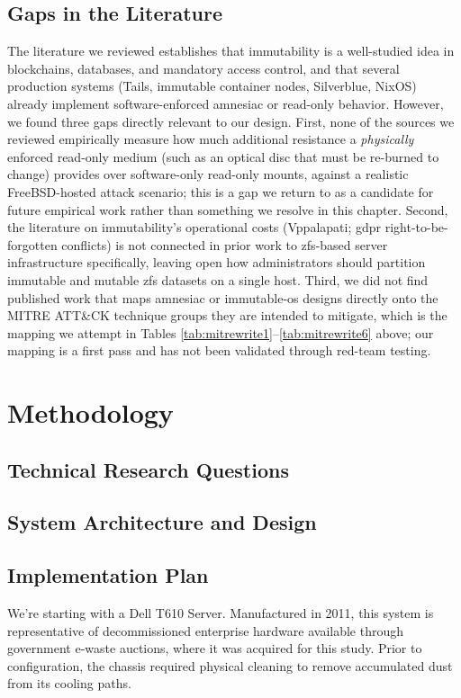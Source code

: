 \subsection{Gaps in the Literature}
The literature we reviewed establishes that immutability is a well-studied idea in blockchains, databases, and mandatory access control, and that several production systems (Tails, immutable container nodes, Silverblue, NixOS) already implement software-enforced amnesiac or read-only behavior.  However, we found three gaps directly relevant to our design.  First, none of the sources we reviewed empirically measure how much additional resistance a \emph{physically} enforced read-only medium (such as an optical disc that must be re-burned to change) provides over software-only read-only mounts, against a realistic FreeBSD-hosted \gls{attack} scenario; this is a gap we return to as a candidate for future empirical work rather than something we resolve in this chapter.  Second, the literature on immutability's operational costs (Vppalapati; \gls{gdpr} right-to-be-forgotten conflicts) is not connected in prior work to \gls{zfs}-based server infrastructure specifically, leaving open how administrators should partition immutable and mutable \gls{zfs} datasets on a single host.  Third, we did not find published work that maps \gls{amnesiac} or immutable-\gls{os} designs directly onto the MITRE ATT\&CK technique groups they are intended to mitigate, which is the mapping we attempt in Tables \ref{tab:mitrewrite1}--\ref{tab:mitrewrite6} above; our mapping is a first pass and has not been validated through red-team testing.

\section{Methodology}
\subsection{Technical Research Questions}
\subsection{System Architecture and Design}
\subsection{Implementation Plan}
We're starting with a Dell T610 Server.  Manufactured in 2011, this system is representative of decommissioned enterprise hardware available through government e-waste auctions, where it was acquired for this study.  Prior to configuration, the chassis required physical cleaning to remove accumulated dust from its cooling paths.

